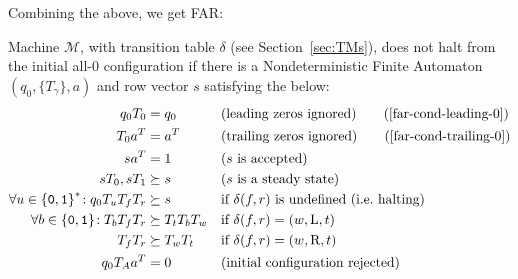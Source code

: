 Combining the above, we get FAR:



\begin{theorem}
    \label{far-main-theorem}
    Machine $\mathcal{M}$, with transition table $\delta$ (see Section~\ref{sec:TMs}), does not halt from the initial all-0 configuration if there is a Nondeterministic Finite Automaton $(q_0, \{T_\gamma\}, a)$ and row vector $s$ satisfying the below:
    \begin{align}
        \label{far-cond-first}
        q_0 T_0                                    & = q_0
                                                   &                     & \text{(leading zeros ignored)}
        \tag{\ref{far-cond-leading-0}}
        \\
        T_0a\T                                     & = a\T
                                                   &                     & \text{(trailing zeros ignored)}
        \tag{\ref{far-cond-trailing-0}}
        \\
        sa\T                                       & = 1
                                                   &                     & \text{($s$ is accepted)}
        \label{far-cond-ass-accepted}
        \\
        sT_0,sT_1                                  & \succeq s
                                                   &                     & \text{($s$ is a steady state)}
        \label{far-cond-ass-steady}
        \\
        \forall u\in\balphabet^*\!: q_0T_u T_f T_r & \succeq s
                                                   &                     & \text{if $\delta(f,r)$ is undefined (\ie halting)}
        \label{far-cond-halt}
        \\
        \forall b\in\balphabet\!: T_b T_f T_r      & \succeq T_t T_b T_w
                                                   &                     & \text{if $\delta(f,r) = (w,\text{L},t)$}
        \label{far-cond-left}
        \\
        T_f T_r                                    & \succeq T_w T_t
                                                   &                     & \text{if $\delta(f,r) = (w,\text{R},t)$}
        \label{far-cond-last}
        \\
        q_0 T_A a\T                                & = 0
                                                   &                     & \text{(initial configuration rejected)}
        \label{far-cond-reject-start}
    \end{align}
\end{theorem}
